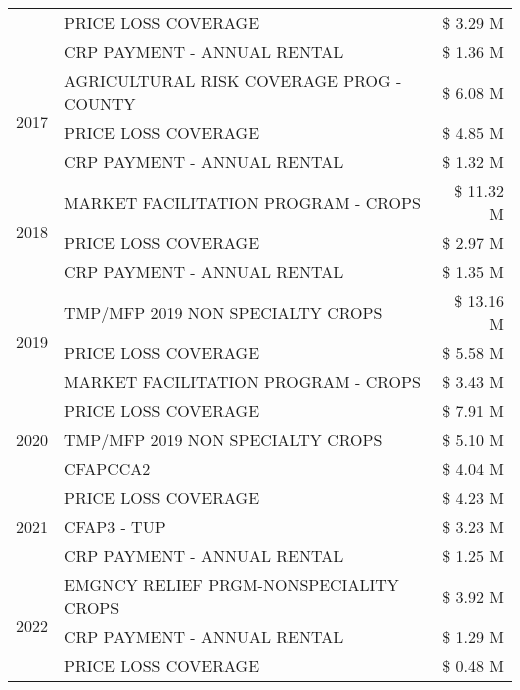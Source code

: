 \begin{tabular}{llr}
 & PRICE LOSS COVERAGE & \$ 3.29 M \\
 & CRP PAYMENT - ANNUAL RENTAL & \$ 1.36 M \\
\cline{1-3}
\multirow[t]{3}{*}{2017} & AGRICULTURAL RISK COVERAGE PROG - COUNTY & \$ 6.08 M \\
 & PRICE LOSS COVERAGE & \$ 4.85 M \\
 & CRP PAYMENT - ANNUAL RENTAL & \$ 1.32 M \\
\cline{1-3}
\multirow[t]{3}{*}{2018} & MARKET FACILITATION PROGRAM - CROPS & \$ 11.32 M \\
 & PRICE LOSS COVERAGE & \$ 2.97 M \\
 & CRP PAYMENT - ANNUAL RENTAL & \$ 1.35 M \\
\cline{1-3}
\multirow[t]{3}{*}{2019} & TMP/MFP 2019 NON SPECIALTY CROPS & \$ 13.16 M \\
 & PRICE LOSS COVERAGE & \$ 5.58 M \\
 & MARKET FACILITATION PROGRAM - CROPS & \$ 3.43 M \\
\cline{1-3}
\multirow[t]{3}{*}{2020} & PRICE LOSS COVERAGE & \$ 7.91 M \\
 & TMP/MFP 2019 NON SPECIALTY CROPS & \$ 5.10 M \\
 & CFAPCCA2 & \$ 4.04 M \\
\cline{1-3}
\multirow[t]{3}{*}{2021} & PRICE LOSS COVERAGE & \$ 4.23 M \\
 & CFAP3 - TUP & \$ 3.23 M \\
 & CRP PAYMENT - ANNUAL RENTAL & \$ 1.25 M \\
\cline{1-3}
\multirow[t]{3}{*}{2022} & EMGNCY RELIEF PRGM-NONSPECIALITY CROPS & \$ 3.92 M \\
 & CRP PAYMENT - ANNUAL RENTAL & \$ 1.29 M \\
 & PRICE LOSS COVERAGE & \$ 0.48 M \\
\cline{1-3}
\bottomrule
\end{tabular}

